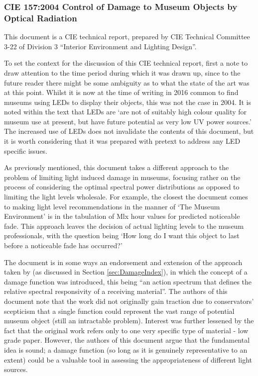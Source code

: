 \subsubsection{\gls{CIE} 157:2004 Control of Damage to Museum Objects by Optical Radiation}

This document is a \gls{CIE} technical report, prepared by \gls{CIE} Technical Committee 3-22 of Division 3 ``Interior Environment and Lighting Design''. 

To set the context for the discussion of this \gls{CIE} technical report, first a note to draw attention to the time period during which it was drawn up, since to the future reader there might be some ambiguity as to what the state of the art was at this point. Whilst it is now at the time of writing in 2016 common to find museums using LEDs to display their objects, this was not the case in 2004. It is noted within the text that LEDs are `are not of suitably high colour quality for museum use at present, but have future potential as very low UV power sources.' The increased use of LEDs does not invalidate the contents of this document, but it is worth considering that it was prepared with pretext to address any LED specific issues.

As previously mentioned, this document takes a different approach to the problem of limiting light induced damage in museums, focusing rather on the process of considering the optimal spectral power distributions as opposed to limiting the light levels wholesale. For example, the closest the document comes to making light level recommendations in the manner of `The Museum Environment' \citep{thomson_museum_1986} is in the tabulation of Mlx hour values for predicted noticeable fade. This approach leaves the decision of actual lighting levels to the museum professionals, with the question being `How long do I want this object to last before a noticeable fade has occurred?'

The document is in some ways an endorsement and extension of the approach taken by \citet{harrison_report_1953} (as discussed in Section \ref{sec:DamageIndex}), in which the concept of a damage function was introduced, this being ``an action spectrum that defines the relative spectral responsivity of a receiving material''. The authors of this document note that the work did not originally gain traction due to conservators' scepticism that a single function could represent the vast range of potential museum object (still an intractable problem). Interest was further lessened by the fact that the original work refers only to one very specific type of material - low grade paper. However, the authors of this document argue that the fundamental idea is sound; a damage function (so long as it is genuinely representative to an extent) could be a valuable tool in assessing the appropriateness of different light sources.


